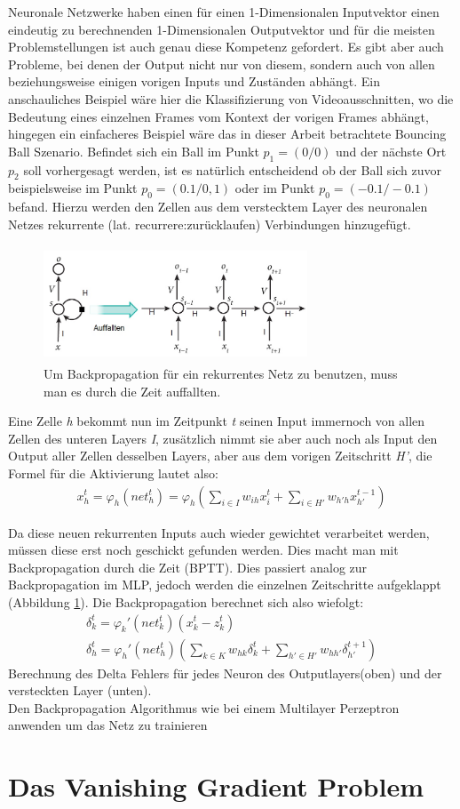 Neuronale Netzwerke haben einen für einen 1-Dimensionalen Inputvektor einen eindeutig zu berechnenden 1-Dimensionalen Outputvektor und für die meisten Problemstellungen ist auch genau diese Kompetenz gefordert. Es gibt aber auch Probleme, bei denen der Output nicht nur von diesem, sondern auch von allen beziehungsweise einigen vorigen Inputs und Zuständen abhängt. Ein anschauliches Beispiel wäre hier die Klassifizierung von Videoausschnitten, wo die Bedeutung eines einzelnen Frames vom Kontext der vorigen Frames abhängt, hingegen ein einfacheres Beispiel wäre das in dieser Arbeit betrachtete Bouncing Ball Szenario. Befindet sich ein Ball im Punkt \(p_{1}=(0/0)\) und der nächste Ort \(p_{2}\) soll vorhergesagt werden, ist es natürlich entscheidend ob der Ball sich zuvor beispielsweise im Punkt \(p_{0}=(0.1/0,1)\) oder im Punkt \(p_{0}=(-0.1/-0.1)\) befand. Hierzu werden den Zellen aus dem verstecktem Layer des neuronalen Netzes rekurrente (lat. recurrere:zurücklaufen) Verbindungen hinzugefügt.
\begin{figure}
	\centering
	\includegraphics[width=0.7\textwidth, height=130px]{pics/rnn.jpg}	
	\caption{Um Backpropagation für ein rekurrentes Netz zu benutzen, muss man es durch die Zeit auffallten. \cite{bib:rnn}}
	\label{img:rnn}
\end{figure}
Eine Zelle \textit{h} bekommt nun im Zeitpunkt \textit{t} seinen Input immernoch von allen Zellen des unteren Layers \textit{I}, zusätzlich nimmt sie aber auch noch als Input den Output aller Zellen desselben Layers, aber aus dem vorigen Zeitschritt \textit{H'}, die Formel für die Aktivierung lautet also: 
\begin{gather}
x^{t}_{h}=\varphi_{h}(net_{h}^{t})=\varphi_{h}(\sum_{i \in I}w_{ih}x^{t}_{i}+\sum_{i \in H'}w_{h'h}x^{t-1}_{h'})
\end{gather}

Da diese neuen rekurrenten Inputs auch wieder gewichtet verarbeitet werden, müssen diese erst noch geschickt gefunden werden. Dies macht man mit Backpropagation durch die Zeit (BPTT). Dies passiert analog zur Backpropagation im MLP, jedoch werden die einzelnen Zeitschritte aufgeklappt (Abbildung \ref{img:rnn}). Die Backpropagation berechnet sich also wiefolgt:
\begin{gather}
	\delta_{k}^{t} = \varphi_{k}'(net_{k}^{t})(x_{k}^{t}-z^{t}_{k}) \\
	\delta_{h}^{t} = \varphi_{h}'(net_{h}^{t})(\sum_{k \in K}w_{hk}\delta^{t}_{k}+\sum_{h' \in H'}w_{hh'}\delta^{t+1}_{h'})
\end{gather}
Berechnung des Delta Fehlers für jedes Neuron des Outputlayers(oben) und der versteckten Layer (unten). \\ \cite{bib:rnn}
Den Backpropagation Algorithmus wie bei einem Multilayer Perzeptron anwenden um das Netz zu trainieren 
\section{Das Vanishing Gradient Problem}